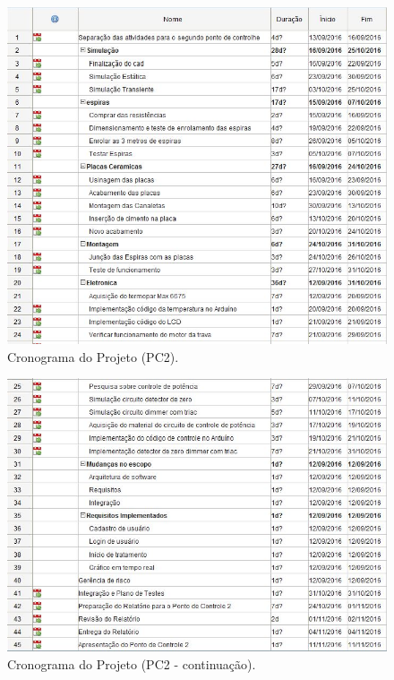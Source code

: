 \begin{figure}[!ht]
	\centering
	\label{cronogramapc2}
	\includegraphics[keepaspectratio=true,scale=0.6]{figuras/cronogramapc2.JPG}
	\caption{Cronograma do Projeto (PC2).}
\end{figure}

\begin{figure}[!ht]
	\centering
	\label{cronogramapc2_cont}
	\includegraphics[keepaspectratio=true,scale=0.6]{figuras/cronogramapc2_cont.JPG}
	\caption{Cronograma do Projeto (PC2 - continuação).}
\end{figure}

